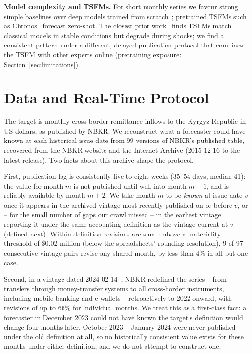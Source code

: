\documentclass[runningheads]{llncs}
\begin{document}
\textbf{Model complexity and TSFMs.} For short monthly series we favour strong simple baselines over deep models trained from
scratch~\cite{zeng2023transformers}; pretrained TSFMs such as Chronos~\cite{ansari2024chronos}
forecast zero-shot. The closest prior
work~\cite{jetwiriyanon2025tsfmecon} finds TSFMs match classical models in stable conditions but
degrade during shocks; we find a consistent pattern under a different, delayed-publication protocol that combines the
TSFM with other experts online (pretraining exposure: Section~\ref{sec:limitations}).

\section{Data and Real-Time Protocol}
\label{sec:data}

The target is monthly cross-border remittance inflows to the Kyrgyz Republic in US dollars, as
published by NBKR. We reconstruct what a forecaster could have known at each historical issue date
from 99 versions of NBKR's published table, recovered from the NBKR website and the Internet
Archive (2015-12-16 to the latest release). Two facts about this archive shape the protocol.

First, publication lag is consistently five to eight weeks (35--54 days, median 41): the value for
month $m$ is not published until well into month $m+1$, and is reliably available by month $m+2$.
We take month $m$ to be \emph{known} at issue date $v$ once it appears in the archived vintage most
recently published on or before $v$, or -- for the small number of gaps our crawl missed -- in the
earliest vintage reporting it under the same accounting definition as the vintage current at $v$
(defined next). Within-definition revisions are small: above a materiality threshold of \$0.02
million (below the spreadsheets' rounding resolution), 9 of 97 consecutive vintage pairs revise any
shared month, by less than 4\% in all but one case.

Second, in a vintage dated 2024-02-14~\cite{nbkr2024table}, NBKR redefined the series -- from transfers through
money-transfer systems to all cross-border instruments, including mobile banking and e-wallets --
retroactively to 2022 onward, with revisions of up to 66\% for individual months. We treat this as
a first-class fact: a forecaster in December 2023 could not have known the target's definition
would change four months later. October 2023 -- January
2024 were never published under the old definition at all, so no historically consistent value
exists for these months under either definition, and we do not attempt to construct one.
\end{document}
